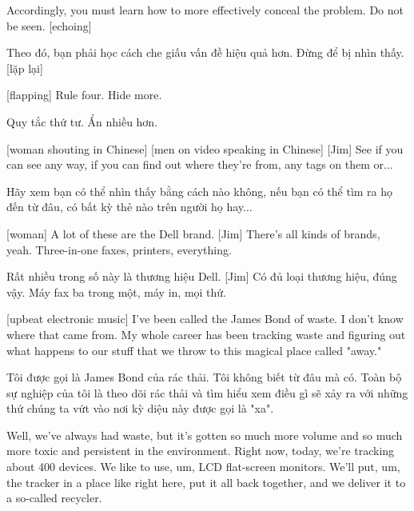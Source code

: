 \documentclass[a4paper]{article}
\begin{document}
	Accordingly, you must learn how to more effectively conceal the problem.
	Do not be seen. [echoing]
	
	\begin{vietnamese-v2}
		Theo đó, bạn phải học cách che giấu vấn đề hiệu quả hơn.
		Đừng để bị nhìn thấy. [lặp lại]
	\end{vietnamese-v2}
	
	[flapping]
	Rule four. Hide more.
	
	\begin{vietnamese-v2}
		[vỗ tay]
		Quy tắc thứ tư. Ẩn nhiều hơn.
	\end{vietnamese-v2}
	
	[woman shouting in Chinese]
	[men on video speaking in Chinese]
	[Jim] See if you can see any way, if you can find out where they're from, any tags on them or...
	
	\begin{vietnamese-v2}
		 Hãy xem bạn có thể nhìn thấy bằng cách nào không, nếu bạn có thể tìm ra họ đến từ đâu, có bất kỳ thẻ nào trên người họ hay...
	\end{vietnamese-v2}
	
	[woman] A lot of these are the Dell brand.
	[Jim] There's all kinds of brands, yeah.
	Three-in-one faxes, printers, everything.
	
	\begin{vietnamese-v2}
		[phụ nữ] Rất nhiều trong số này là thương hiệu Dell.
		[Jim] Có đủ loại thương hiệu, đúng vậy.
		Máy fax ba trong một, máy in, mọi thứ.
	\end{vietnamese-v2}
	
	[upbeat electronic music]
	I've been called the James Bond of waste.
	I don't know where that came from.
	My whole career has been tracking waste and figuring out what happens to our stuff that we throw to this magical place called "away."
	
	\begin{vietnamese-v2}
		Tôi được gọi là James Bond của rác thải.
		Tôi không biết từ đâu mà có.
		Toàn bộ sự nghiệp của tôi là theo dõi rác thải và tìm hiểu xem điều gì sẽ xảy ra với những thứ chúng ta vứt vào nơi kỳ diệu này được gọi là "xa".
	\end{vietnamese-v2}
	
	Well, we've always had waste, but it's gotten so much more volume and so much more toxic and persistent in the environment.
	Right now, today, we're tracking about 400 devices.
	We like to use, um, LCD flat-screen monitors.
	We'll put, um, the tracker in a place like right here, put it all back together, and we deliver it to a so-called recycler.
	
\end{document}
